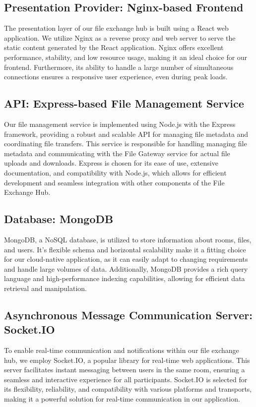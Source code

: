 \documentclass[a4paper,fleqn]{cas-sc}
\begin{document}
\subsection{Presentation Provider: Nginx-based Frontend}

The presentation layer of our file exchange hub is built using a React web application. We utilize Nginx as a reverse proxy and web server to serve the static content generated by the React application. Nginx offers excellent performance, stability, and low resource usage, making it an ideal choice for our frontend. Furthermore, its ability to handle a large number of simultaneous connections ensures a responsive user experience, even during peak loads.

\subsection{API: Express-based File Management Service}

Our file management service is implemented using Node.js with the Express framework, providing a robust and scalable API for managing file metadata and coordinating file transfers. This service is responsible for handling managing file metadata and communicating with the File Gateway service for actual file uploads and downloads. Express is chosen for its ease of use, extensive documentation, and compatibility with Node.js, which allows for efficient development and seamless integration with other components of the File Exchange Hub.

\subsection{Database: MongoDB}

MongoDB, a NoSQL database, is utilized to store information about rooms, files, and users. It's flexible schema and horizontal scalability make it a fitting choice for our cloud-native application, as it can easily adapt to changing requirements and handle large volumes of data. Additionally, MongoDB provides a rich query language and high-performance indexing capabilities, allowing for efficient data retrieval and manipulation.

\subsection{Asynchronous Message Communication Server: Socket.IO}

To enable real-time communication and notifications within our file exchange hub, we employ Socket.IO, a popular library for real-time web applications. This server facilitates instant messaging between users in the same room, ensuring a seamless and interactive experience for all participants. Socket.IO is selected for its flexibility, reliability, and compatibility with various platforms and transports, making it a powerful solution for real-time communication in our application.
\end{document}
